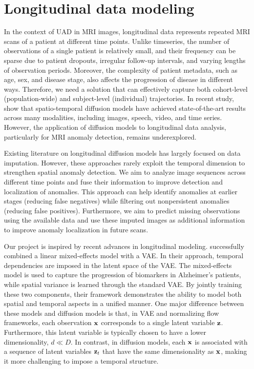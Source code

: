 \section{Longitudinal data modeling}
\label{sec:introduction-tdm}

In the context of \ac{UAD} in MRI images, longitudinal data represents repeated MRI scans of a patient at different time points. Unlike timeseries, the number of observations of a single patient is relatively small, and their frequency can be sparse due to patient dropouts, irregular follow-up intervals, and varying lengths of observation periods. Moreover, the complexity of patient metadata, such as age, sex, and disease stage, also affects the progression of disease in different ways. Therefore, we need a solution that can effectively capture both cohort-level (population-wide) and subject-level (individual) trajectories. In recent study, \cite{yangSurveyDiffusionModelsSpatioTemporal2024} show that spatio-temporal diffusion models have achieved state-of-the-art results across many modalities, including images, speech, video, and time series. However, the application of diffusion models to longitudinal data analysis, particularly for MRI anomaly detection, remains underexplored.

Existing literature on longitudinal diffusion models has largely focused on data imputation. However, these approaches rarely exploit the temporal dimension to strengthen spatial anomaly detection. We aim to analyze image sequences across different time points and fuse their information to improve detection and localization of anomalies. This approach can help identify anomalies at earlier stages (reducing false negatives) while filtering out nonpersistent anomalies (reducing false positives). Furthermore, we aim to predict missing observations using the available data and use these imputed images as additional information to improve anomaly localization in future scans.

Our project is inspired by recent advances in longitudinal modeling. \cite{SautyLongitudinalVAE2022} successfully combined a linear mixed-effects model with a \ac{VAE}. In their approach, temporal dependencies are imposed in the latent space of the \ac{VAE}. The mixed-effects model is used to capture the progression of biomarkers in Alzheimer's patients, while spatial variance is learned through the standard \ac{VAE}. By jointly training these two components, their framework demonstrates the ability to model both spatial and temporal aspects in a unified manner. One major difference between these models and diffusion models is that, in \ac{VAE} and normalizing flow frameworks, each observation ${\mathbf{x}}$ corresponds to a single latent variable ${\mathbf{z}}$. Furthermore, this latent variable is typically chosen to have a lower dimensionality, $d \ll D$. In contrast, in diffusion models, each ${\mathbf{x}}$ is associated with a sequence of latent variables ${\mathbf{z}}_t$ that have the same dimensionality as ${\mathbf{x}}$, making it more challenging to impose a temporal structure.

